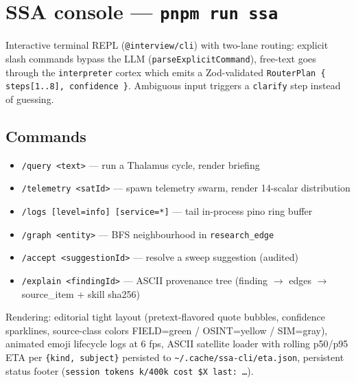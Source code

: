 




\makespecheader

\section{SSA console --- \texttt{pnpm run ssa}}

Interactive terminal REPL (\texttt{@interview/cli}) with two-lane routing: explicit slash commands bypass the LLM (\texttt{parseExplicitCommand}), free-text goes through the \texttt{interpreter} cortex which emits a Zod-validated \texttt{RouterPlan \{ steps[1..8], confidence \}}. Ambiguous input triggers a \texttt{clarify} step instead of guessing.

\subsection{Commands}

\begin{itemize}[leftmargin=1.2em]
  \item \texttt{/query <text>} --- run a Thalamus cycle, render briefing
  \item \texttt{/telemetry <satId>} --- spawn telemetry swarm, render 14-scalar distribution
  \item \texttt{/logs [level=info] [service=*]} --- tail in-process pino ring buffer
  \item \texttt{/graph <entity>} --- BFS neighbourhood in \texttt{research\_edge}
  \item \texttt{/accept <suggestionId>} --- resolve a sweep suggestion (audited)
  \item \texttt{/explain <findingId>} --- ASCII provenance tree (finding $\to$ edges $\to$ source\_item + skill sha256)
\end{itemize}

Rendering: editorial tight layout (pretext-flavored quote bubbles, confidence sparklines, source-class colors FIELD=green / OSINT=yellow / SIM=gray), animated emoji lifecycle logs at 6 fps, ASCII satellite loader with rolling p50/p95 ETA per \texttt{\{kind, subject\}} persisted to \texttt{\~{}/.cache/ssa-cli/eta.json}, persistent status footer (\texttt{session \textperiodcentered{} tokens k/400k \textperiodcentered{} cost \$X \textperiodcentered{} last: \dots}).

